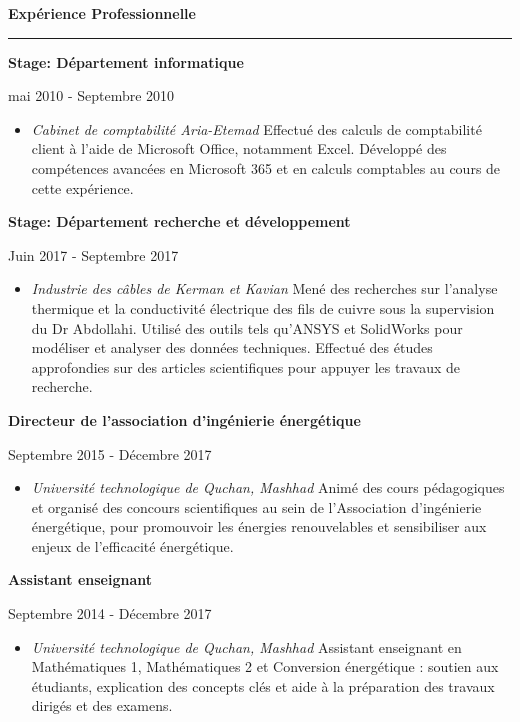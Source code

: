 \documentclass[a4paper]{letter}
\newcommand{\divider}{\rule{\linewidth}{0.9pt}}
\begin{document}
\begin{minipage}[t]{0.60\textwidth}
{\large \textbf{Expérience Professionnelle}}
\divider
    

\vspace{1mm}
{\textbf{Stage: Département informatique}}

{\footnotesize mai 2010 - Septembre 2010}
\begin{itemize}
    \footnotesize \item \textit{Cabinet de comptabilité Aria-Etemad}
   \newline
    Effectué des calculs de comptabilité client à l’aide de Microsoft Office, notamment Excel. Développé des compétences avancées en Microsoft 365 et en calculs comptables au cours de cette expérience.
\end{itemize}


\vspace{3mm}
{\textbf{Stage: Département recherche et développement}}

{\footnotesize Juin 2017 - Septembre 2017}
\begin{itemize}
    \footnotesize \item \textit{Industrie des câbles de Kerman et Kavian}
   \newline
    Mené des recherches sur l’analyse thermique et la conductivité électrique des fils de cuivre sous la supervision du Dr Abdollahi. Utilisé des outils tels qu’ANSYS et SolidWorks pour modéliser et analyser des données techniques. Effectué des études approfondies sur des articles scientifiques pour appuyer les travaux de recherche.
\end{itemize}


\vspace{3mm}
{\textbf{Directeur de l'association d'ingénierie énergétique}}

{\footnotesize Septembre 2015 - Décembre 2017}
\begin{itemize}
   \footnotesize \item \textit{Université technologique de Quchan, Mashhad}
   \newline
   Animé des cours pédagogiques et organisé des concours scientifiques au sein de l'Association d'ingénierie énergétique, pour promouvoir les énergies renouvelables et sensibiliser aux enjeux de l'efficacité énergétique.
\end{itemize}

\vspace{3mm}

{ \textbf{Assistant enseignant}}

{ \footnotesize Septembre 2014 - Décembre 2017}
\begin{itemize}
    \footnotesize \item \textit{Université technologique de Quchan, Mashhad}
    \newline
    Assistant enseignant en Mathématiques 1, Mathématiques 2 et Conversion énergétique : soutien aux étudiants, explication des concepts clés et aide à la préparation des travaux dirigés et des examens.
\end{itemize}



\end{minipage}
\end{document}
